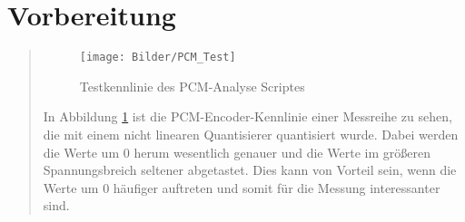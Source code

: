 \newcommand{\institut}{Institut f\"ur Telekommunikationssysteme}
\newcommand{\fachgebiet}{Nachrichten\"ubertragung}
\newcommand{\veranstaltung}{Praktikum Nachrichten\"ubertragung}
\newcommand{\pdfautor}{Dirk Babendererde (321 836), Thomas Kapa (325 219)}
\newcommand{\autor}{Dirk Babendererde (321 836)\\ Thomas Kapa (325 219)}
\newcommand{\gruppe}{Gruppe:}
\newcommand{\betreuer}{Betreuer: Lieven Lange}


\newcommand{\pdftitle}{Nachrichtenuebertragung\ Praktikum\ 06}
\newcommand{\prototitle}{Praktikum 06 \\ Digitale Übertragungstechnik: Digitale Empfänger}






%     


\section{Vorbereitung}
\begin{quote}
    
    
    \begin{figure}[H]
        \centering
        \texttt{[image: Bilder/PCM\_Test]}
        \caption{Testkennlinie des PCM-Analyse Scriptes}
        \label{fig:PCM_Test}
    \end{figure}
    
    \vspace{2em}
    
    In Abbildung \ref{fig:PCM_Test} ist die PCM-Encoder-Kennlinie einer Messreihe zu sehen, die mit einem nicht
    linearen Quantisierer quantisiert wurde. Dabei werden die Werte um 0 herum wesentlich genauer und die
    Werte im größeren Spannungsbreich seltener abgetastet. Dies kann von Vorteil sein, wenn die Werte um 0 häufiger
    auftreten und somit für die Messung interessanter sind.\\
    
    
    
    
    
    
    
    
\end{quote}


